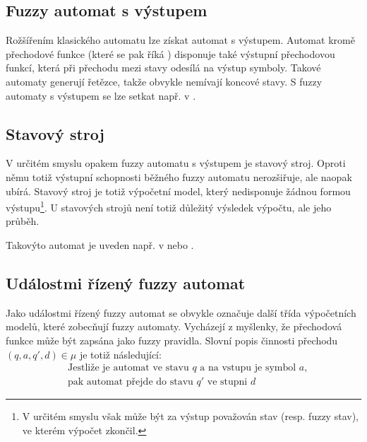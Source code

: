 \documentclass[a4paper,10pt]{article}
\begin{document}
\subsection{Fuzzy automat s výstupem}
Rožšířením klasického automatu lze získat automat s výstupem. Automat kromě přechodové funkce (které se pak říká ) disponuje také výstupní přechodovou funkcí, která při přechodu mezi stavy odesílá na výstup symboly. Takové automaty generují řetězce, takže obvykle nemívají koncové stavy. S fuzzy automaty s výstupem se lze setkat např. v \cite{BlaDelPeg-FuzzAutIndUsNeuNet}\cite{PedGac-LeaFuzzAut}\cite{BlaDelPeg-FuzzGraIntUsiNeuNet}\cite{CheMo-MinAlgFuzFinAut}\cite{ThoMar-DetAccRegFuzLang}.

\subsection{Stavový stroj}
V určitém smyslu opakem fuzzy automatu s výstupem je stavový stroj. Oproti němu totiž výstupní schopnosti běžného fuzzy automatu nerozšiřuje, ale naopak ubírá. Stavový stroj je totiž výpočetní model, který nedisponuje žádnou formou výstupu\footnote{V určitém smyslu však může být za výstup považován stav (resp. fuzzy stav), ve kterém výpočet zkončil.}. U stavových strojů není totiž důležitý výsledek výpočtu, ale jeho průběh.

Takovýto automat je uveden např. v \cite{Qiu-ChaFuzFinAut} nebo \cite{AlvJoaCru-FuStMaAppEmoModEleGamCha}.

\subsection{Událostmi řízený fuzzy automat} \label{subsec:FuzzEvMach}
Jako událostmi řízený fuzzy automat se obvykle označuje další třída výpočetních modelů, které zobecňují fuzzy automaty. Vycházejí z myšlenky, že přechodová funkce může být zapsána jako fuzzy \ifthen pravidla. Slovní popis činnosti přechodu $(q, a, q', d) \in \mu$ je totiž následující:
\begin{align*}
 &\text{Jestliže je automat ve stavu $q$ a na vstupu je symbol $a$,} \\
 &\text{pak automat přejde do stavu $q'$ ve stupni $d$ }
\end{align*}
\end{document}
